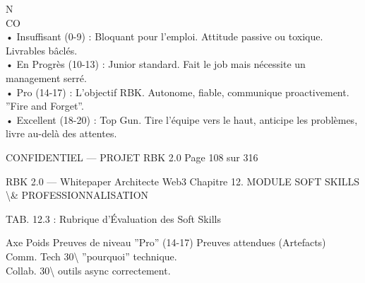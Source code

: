 \documentclass[12pt,landscape,a4paper]{article}
\newenvironment{confidential}
{\begin{tcolorbox}[
    colback=rbkred!5!white,
    colframe=rbkred!75!black,
    title=CONFIDENTIEL,
    fonttitle=\bfseries\color{white},
    coltitle=rbkred!75!black,
    breakable,
    enhanced,
    frame hidden,
    borderline west={2pt}{0pt}{rbkred!75!black}
]}
{\end{tcolorbox}}
\begin{document}
N\\
CO\\
• Insuffisant (0-9) : Bloquant pour l’emploi. Attitude passive ou toxique. Livrables bâclés.\\
\vspace{0.5em}
• En Progrès (10-13) : Junior standard. Fait le job mais nécessite un management serré.\\
\vspace{0.5em}
• Pro (14-17) : L’objectif RBK. Autonome, fiable, communique proactivement. ”Fire and Forget”.\\
\vspace{0.5em}
• Excellent (18-20) : Top Gun. Tire l’équipe vers le haut, anticipe les problèmes, livre au-delà des attentes.\\
\vspace{0.5em}
\vspace{0.5em}
\vspace{0.5em}
\vspace{0.5em}
\begin{confidential}CONFIDENTIEL — PROJET RBK 2.0                                 Page 108 sur 316\end{confidential}
RBK 2.0 — Whitepaper Architecte Web3                                                  Chapitre 12. MODULE SOFT SKILLS \textbackslash{}& PROFESSIONNALISATION\\
\vspace{0.5em}
\vspace{0.5em}
\begin{center}\begin{tabular}TAB. 12.3 : Rubrique d’Évaluation des Soft Skills\end{tabular}\end{center}
\vspace{0.5em}
\vspace{0.5em}
Axe        Poids Preuves de niveau ”Pro” (14-17)                                       Preuves attendues (Artefacts)\\
Comm. Tech 30\textbackslash{}%
”pourquoi” technique.\\
Collab.    30\textbackslash{}%
outils async correctement.\\
\end{document}

